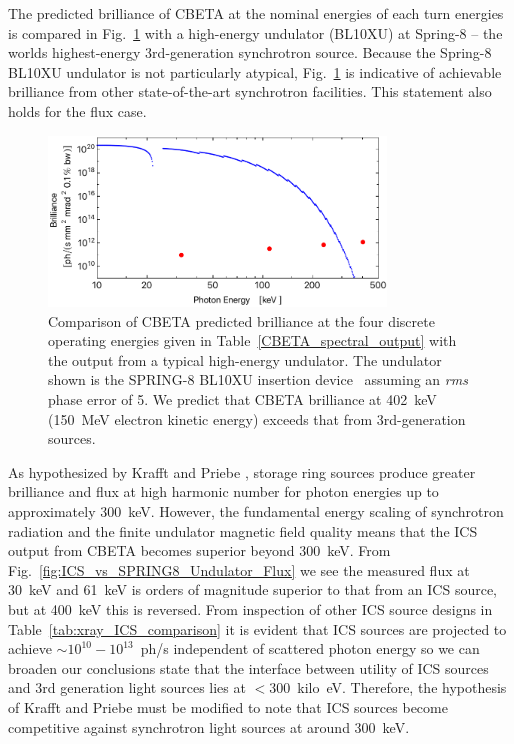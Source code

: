 \documentclass[../main.tex]{subfiles}
\begin{document}
The predicted brilliance of CBETA at the nominal energies of each turn energies is compared in Fig.~\ref{fig:ICS_vs_SPRING8_Undulator_Brilliance} with a high-energy undulator (BL10XU) at Spring-8 -- the worlds highest-energy 3rd-generation synchrotron source. Because the Spring-8 BL10XU undulator is not particularly atypical, Fig.~\ref{fig:ICS_vs_SPRING8_Undulator_Brilliance} is indicative of achievable brilliance from other state-of-the-art synchrotron facilities. This statement also holds for the flux case.

\begin{figure}[!h]
\centering
\includegraphics[width=0.8\textwidth]{Figures/CBETA_Inverse_Compton_Source_Design/spring8bl10brillianceplot.pdf}
\caption{Comparison of CBETA predicted brilliance at the four discrete operating energies given in Table~\ref{CBETA_spectral_output} with the output from a typical high-energy undulator. The undulator shown is the SPRING-8 BL10XU insertion device~\cite{spring8beamlines} assuming an \textit{rms} phase error of 5\si{\degrees}. We predict that CBETA brilliance at 402~\si{\kilo\electronvolt} (150~\si{\mega\electronvolt} electron kinetic energy) exceeds that from 3rd-generation sources.}
\label{fig:ICS_vs_SPRING8_Undulator_Brilliance}
\end{figure}

As hypothesized by Krafft and Priebe \cite{krafft2010compton}, storage ring sources produce greater brilliance and flux at high harmonic number for photon energies up to approximately 300~\si{\kilo\electronvolt}. However, the fundamental energy scaling of synchrotron radiation and the finite undulator magnetic field quality means that the ICS output from CBETA becomes superior beyond 300~\si{\kilo\electronvolt}. From Fig.~\ref{fig:ICS_vs_SPRING8_Undulator_Flux} we see the measured flux at 30~\si{\kilo\electronvolt} and 61~\si{\kilo\electronvolt} \cite{spring8beamlines} is orders of magnitude superior to that from an ICS source, but at 400~\si{\kilo\electronvolt} this is reversed. From inspection of other ICS source designs in Table~\ref{tab:xray_ICS_comparison} it is evident that ICS sources are projected to achieve $\sim 10^{10} - 10^{13}$~ph/\si{\second} independent of scattered photon energy so we can broaden our conclusions state that the interface between utility of ICS sources and 3rd generation light sources lies at $< 300$~\si{kilo\electronvolt}. Therefore, the hypothesis of Krafft and Priebe \cite{krafft2010compton} must be modified to note that ICS sources become competitive against synchrotron light sources at around 300~\si{\kilo\electronvolt}.  
\end{document}
